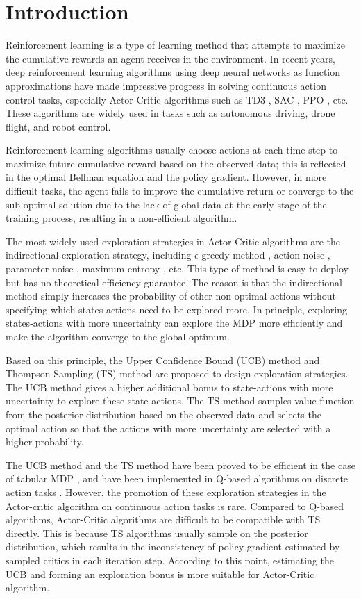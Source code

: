 \section{Introduction}
Reinforcement learning is a type of learning method that attempts to maximize the cumulative rewards an agent receives in the environment. In recent years, deep reinforcement learning algorithms using deep neural networks as function approximations have made impressive progress in solving continuous action control tasks, especially Actor-Critic algorithms such as TD3 \cite{TD3}, SAC \cite{SAC}, PPO \cite{PPO}, etc. These algorithms are widely used in tasks such as autonomous driving, drone flight, and robot control.

Reinforcement learning algorithms usually choose actions at each time step to maximize future cumulative reward based on the observed data; this is reflected in the optimal Bellman equation and the policy gradient. However, in more difficult tasks, the agent fails to improve the cumulative return or converge to the sub-optimal solution due to the lack of global data at the early stage of the training process, resulting in a non-efficient algorithm.

The most widely used exploration strategies in Actor-Critic algorithms are the indirectional exploration strategy, including $\epsilon$-greedy method \cite{DQN}, action-noise \cite{DDPG}, parameter-noise \cite{pnoise}, maximum entropy \cite{SQL}, etc. This type of method is easy to deploy but has no theoretical efficiency guarantee. The reason is that the indirectional method simply increases the probability of other non-optimal actions without specifying which states-actions need to be explored more. In principle, exploring states-actions with more uncertainty can explore the MDP more efficiently and make the algorithm converge to the global optimum.

Based on this principle, the Upper Confidence Bound (UCB) method \cite{auer2002finite,audibert2009exploration} and Thompson Sampling (TS) method \cite{TS,TStutorial} are proposed to design exploration strategies. The UCB method gives a higher additional bonus to state-actions with more uncertainty to explore these state-actions. The TS method samples value function from the posterior distribution based on the observed data and selects the optimal action so that the actions with more uncertainty are selected with a higher probability.

The UCB method and the TS method have been proved to be efficient in the case of tabular MDP \cite{TStutorial}, and have been implemented in Q-based algorithms on discrete action tasks \cite{BDQN,osband2018randomized}. However, the promotion of these exploration strategies in the Actor-critic algorithm on continuous action tasks is rare. Compared to Q-based algorithms, Actor-Critic algorithms are difficult to be compatible with TS directly. This is because TS algorithms usually sample on the posterior distribution, which results in the inconsistency of policy gradient estimated by sampled critics in each iteration step. According to this point, estimating the UCB and forming an exploration bonus is more suitable for Actor-Critic algorithm.

